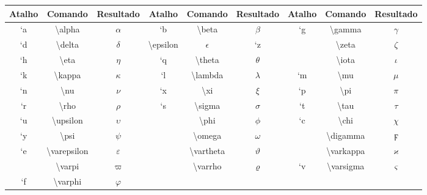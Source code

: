 % 
% 
% 
% 
% 
\begin{tabular}{ccc|ccc|ccc}
    \hline
    Atalho & Comando & Resultado & Atalho & Comando & Resultado & Atalho & Comando & Resultado \\ \hline
    `\textsf{a} & \textbackslash\textsf{alpha} & $\alpha$ & `\textsf{b} & \textbackslash\textsf{beta} & $\beta$ & `\textsf{g} & \textbackslash\textsf{gamma} & $\gamma$ \\
    `\textsf{d} & \textbackslash\textsf{delta} & $\delta$ & \textbackslash\textsf{epsilon} & $\epsilon$ & `\textsf{z} & & \textbackslash\textsf{zeta} & $\zeta$ \\
    `\textsf{h} & \textbackslash\textsf{eta} & $\eta$ & `\textsf{q} & \textbackslash\textsf{theta} & $\theta$ & & \textbackslash\textsf{iota} & $\iota$ \\
    `\textsf{k} & \textbackslash\textsf{kappa} & $\kappa$ & `\textsf{l} & \textbackslash\textsf{lambda} & $\lambda$ & `\textsf{m} & \textbackslash\textsf{mu} & $\mu$ \\
    `\textsf{n} & \textbackslash\textsf{nu} & $\nu$ & `\textsf{x} & \textbackslash\textsf{xi} & $\xi$ & `\textsf{p} & \textbackslash\textsf{pi} & $\pi$ \\
    `\textsf{r} & \textbackslash\textsf{rho} & $\rho$ & `\textsf{s} & \textbackslash\textsf{sigma} & $\sigma$ & `\textsf{t} & \textbackslash\textsf{tau} & $\tau$ \\
    `\textsf{u} & \textbackslash\textsf{upsilon} & $\upsilon$ & & \textbackslash\textsf{phi} & $\phi$ & `\textsf{c} & \textbackslash\textsf{chi} & $\chi$ \\
    `\textsf{y} & \textbackslash\textsf{psi} & $\psi$ & & \textbackslash\textsf{omega} & $\omega$ & & \textbackslash\textsf{digamma} & $\digamma$ \\
    `\textsf{e} & \textbackslash\textsf{varepsilon} & $\varepsilon$ & & \textbackslash\textsf{vartheta} & $\vartheta$ & & \textbackslash\textsf{varkappa} & $\varkappa$ \\
    & \textbackslash\textsf{varpi} & $\varpi$ & & \textbackslash\textsf{varrho} & $\varrho$ & `\textsf{v} & \textbackslash\textsf{varsigma} & $\varsigma$ \\
    `\textsf{f} & \textbackslash\textsf{varphi} & $\varphi$ & & \\ \hline
\end{tabular}
